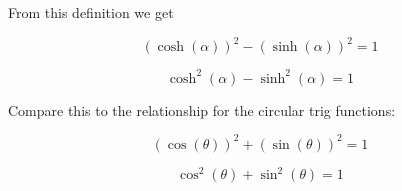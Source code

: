 \documentclass{ximera}
\begin{document}
\begin{image}
\end{image}



From this definition we get 

\[     (\cosh(\alpha))^2 - (\sinh(\alpha))^2 = 1       \]

\[     \cosh^2(\alpha) - \sinh^2(\alpha) = 1       \]

Compare this to the relationship for the circular trig functions:

\[     (\cos(\theta))^2 + (\sin(\theta))^2 = 1       \]

\[     \cos^2(\theta) + \sin^2(\theta) = 1       \]
\end{document}
